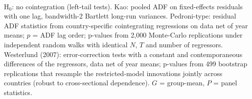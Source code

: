 \\[3pt]\begin{minipage}{\tablewidth}\footnotesize H$_0$: no cointegration (left-tail tests). Kao: pooled ADF on fixed-effects residuals with one lag, bandwidth-2 Bartlett long-run variances. Pedroni-type: residual ADF statistics from country-specific cointegrating regressions on data net of year means; $p$ = ADF lag order; p-values from 2,000 Monte-Carlo replications under independent random walks with identical $N$, $T$ and number of regressors. Westerlund (2007): error-correction tests with a constant and contemporaneous differences of the regressors, data net of year means; p-values from 499 bootstrap replications that resample the restricted-model innovations jointly across countries (robust to cross-sectional dependence). $G$ = group-mean, $P$ = panel statistics.\end{minipage}
